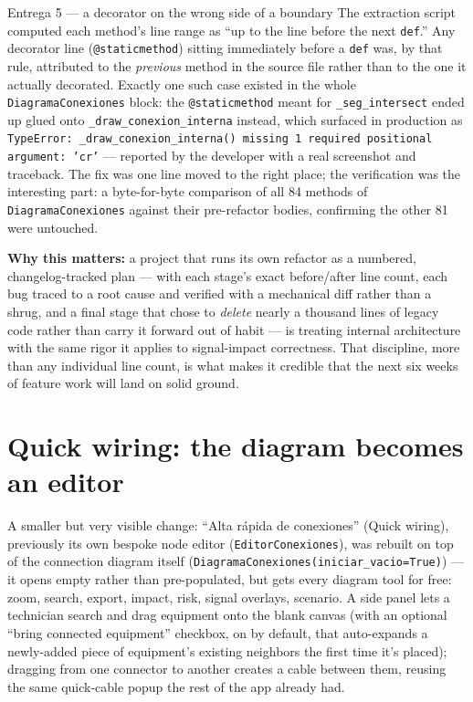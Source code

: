 \documentclass[10.4pt,twocolumn]{article}
\begin{document}
\begin{bugbox}{Entrega 5 --- a decorator on the wrong side of a boundary}
The extraction script computed each method's line range as ``up to the line before the next \texttt{def}.'' Any decorator line (\texttt{@staticmethod}) sitting immediately before a \texttt{def} was, by that rule, attributed to the \emph{previous} method in the source file rather than to the one it actually decorated. Exactly one such case existed in the whole \texttt{DiagramaConexiones} block: the \texttt{@staticmethod} meant for \texttt{\_seg\_intersect} ended up glued onto \texttt{\_draw\_conexion\_interna} instead, which surfaced in production as \texttt{TypeError: \_draw\_conexion\_interna() missing 1 required positional argument: 'cr'} --- reported by the developer with a real screenshot and traceback. The fix was one line moved to the right place; the verification was the interesting part: a byte-for-byte comparison of all 84 methods of \texttt{DiagramaConexiones} against their pre-refactor bodies, confirming the other 81 were untouched.
\end{bugbox}

\begin{pullquote}
\headfont\textbf{Why this matters:} a project that runs its own refactor as a numbered, changelog-tracked plan --- with each stage's exact before/after line count, each bug traced to a root cause and verified with a mechanical diff rather than a shrug, and a final stage that chose to \emph{delete} nearly a thousand lines of legacy code rather than carry it forward out of habit --- is treating internal architecture with the same rigor it applies to signal-impact correctness. That discipline, more than any individual line count, is what makes it credible that the next six weeks of feature work will land on solid ground.
\end{pullquote}

\section{Quick wiring: the diagram becomes an editor}

A smaller but very visible change: ``Alta rápida de conexiones'' (Quick wiring), previously its own bespoke node editor (\texttt{EditorConexiones}), was rebuilt on top of the connection diagram itself (\texttt{DiagramaConexiones(iniciar\_vacio=True)}) --- it opens empty rather than pre-populated, but gets every diagram tool for free: zoom, search, export, impact, risk, signal overlays, scenario. A side panel lets a technician search and drag equipment onto the blank canvas (with an optional ``bring connected equipment'' checkbox, on by default, that auto-expands a newly-added piece of equipment's existing neighbors the first time it's placed); dragging from one connector to another creates a cable between them, reusing the same quick-cable popup the rest of the app already had.
\end{document}
